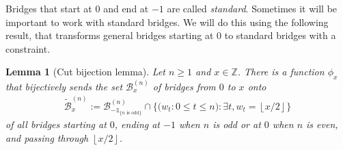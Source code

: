 \documentclass{article}
\newcommand{\1}{\mathbbm{1}}								%
\newtheorem{lemma}[theorem]{Lemma}
\theoremstyle{definition}
\numberwithin{equation}{section}
\newcommand{\cB}{\mathcal B}
\newcommand{\Z}{\mathbb Z}
\newcommand{\floor}[1]{\left\lfloor #1\right\rfloor}
\begin{document}
Bridges that start at $0$ and end at $-1$ are called \emph{standard}. Sometimes it will be important to work with standard bridges. We will do this using the following result, that transforms general bridges starting at $0$ to standard bridges with a constraint.

\begin{lemma}[Cut bijection lemma]\label{lem:cut_bij}
    Let $n\geq1$ and $x\in\Z$.
    There is a function $\phi_x$ that bijectively sends the set $\cB^{(n)}_x$ of bridges from $0$ to $x$ onto
    \begin{align*}
        \tilde{\cB}^{(n)}_x:=\cB_{-\mathbb{1}_{\{n\textrm{ is odd}\}}}^{(n)}\cap\Big\{\big(w_t:0\leq t\leq n\big):\exists t,w_t=\floor{x/2}\Big\}
    \end{align*}
    of all bridges starting at $0$, ending at $-1$ when $n$ is odd or at $0$ when $n$ is even, and passing through $\floor{x/2}$. 
\end{lemma}
\end{document}
